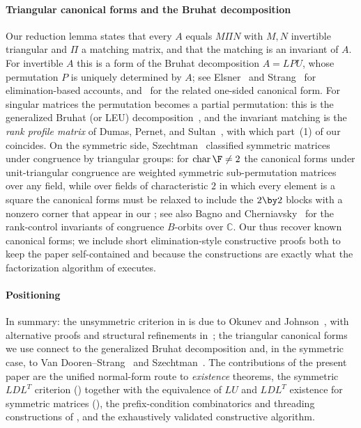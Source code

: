 \paragraph{Triangular canonical forms and the Bruhat decomposition}
Our reduction lemma states that every $A$ equals $M \Pi N$ with $M, N$
invertible triangular and $\Pi$ a matching matrix, and that the matching is
an invariant of $A$.  For invertible $A$ this is a form of the Bruhat
decomposition $A = LPU$, whose permutation $P$ is uniquely determined by
$A$; see Elsner~\cite{elsner_bruhat_1979} and
Strang~\cite{strang_pnas_2010,strang_lpu_2012} for elimination-based
accounts, and~\cite{dopico_multiple_2006} for the related one-sided
canonical form.  For singular matrices the permutation becomes a partial
permutation: this is the generalized Bruhat (or LEU)
decomposition~\cite{malaschonok_2010}, and the invariant matching is the
\emph{rank profile matrix} of Dumas, Pernet, and
Sultan~\cite{dumas_pernet_sultan_2017}, with which part~(1) of our
 coincides.  On the symmetric side,
Szechtman~\cite{szechtman_2007} classified symmetric matrices under
congruence by triangular groups: for $\operatorname{char} \F \neq 2$ the
canonical forms under unit-triangular congruence are weighted symmetric
sub-permutation matrices over any field, while over fields of
characteristic $2$ in which every element is a square the canonical forms
must be relaxed to include the $2 \by 2$ blocks with a nonzero corner that
appear in our ; see also Bagno and
Cherniavsky~\cite{bagno_cherniavsky_2012} for the rank-control invariants
of congruence $B$-orbits over $\mathbb{C}$.  Our
 thus recover known canonical forms;
we include short elimination-style constructive proofs both to keep the
paper self-contained and because the constructions are exactly what the
factorization algorithm of  executes.

\paragraph{Positioning}
In summary: the unsymmetric criterion in  is due to Okunev and
Johnson~\cite{okunev_johnson_2005,johnson_okunev_2025}, with alternative
proofs and structural refinements in~\cite{darve_lu_2026}; the triangular
canonical forms we use connect to the generalized Bruhat decomposition
\cite{elsner_bruhat_1979,malaschonok_2010,dumas_pernet_sultan_2017} and, in
the symmetric case, to Van Dooren--Strang~\cite{vandooren_strang_2014} and
Szechtman~\cite{szechtman_2007}.  The contributions of the present paper
are the unified normal-form route to \emph{existence} theorems, the
symmetric $LDL^T$ criterion () together with the equivalence
of $LU$ and $LDL^T$ existence for symmetric matrices
(), the prefix-condition combinatorics and threading
constructions of , and the
exhaustively validated constructive algorithm.
